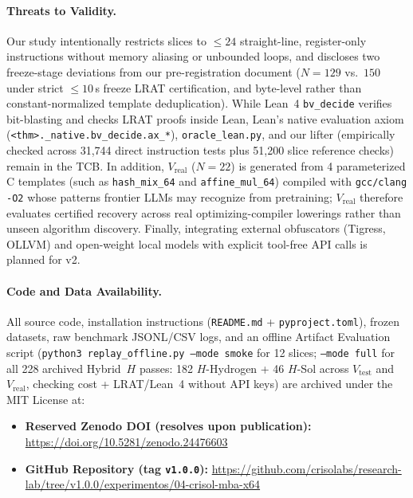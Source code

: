 \documentclass[11pt,a4paper]{article}
\begin{document}
\paragraph{Threats to Validity.}
Our study intentionally restricts slices to $\le 24$ straight-line, register-only instructions without memory aliasing or unbounded loops, and discloses two freeze-stage deviations from our pre-registration document ($N=129$ vs.\ $150$ under strict $\le 10$\,s freeze LRAT certification, and byte-level rather than constant-normalized template deduplication). While Lean~4 \texttt{bv\_decide} verifies bit-blasting and checks LRAT proofs inside Lean, Lean's native evaluation axiom (\texttt{<thm>.\_native.bv\_decide.ax\_*}), \texttt{oracle\_lean.py}, and our lifter (empirically checked across 31,744 direct instruction tests plus 51,200 slice reference checks) remain in the TCB. In addition, $V_{\mathrm{real}}$ ($N=22$) is generated from 4 parameterized C templates (such as \texttt{hash\_mix\_64} and \texttt{affine\_mul\_64}) compiled with \texttt{gcc/clang -O2} whose patterns frontier LLMs may recognize from pretraining; $V_{\mathrm{real}}$ therefore evaluates certified recovery across real optimizing-compiler lowerings rather than unseen algorithm discovery. Finally, integrating external obfuscators (Tigress, OLLVM) and open-weight local models with explicit tool-free API calls is planned for v2.

\paragraph{Code and Data Availability.}
All source code, installation instructions (\texttt{README.md} + \texttt{pyproject.toml}), frozen datasets, raw benchmark JSONL/CSV logs, and an offline Artifact Evaluation script (\texttt{python3 replay\_offline.py --mode smoke} for 12 slices; \texttt{--mode full} for all 228 archived Hybrid~$H$ passes: 182 $H$-Hydrogen + 46 $H$-Sol across $V_{\mathrm{test}}$ and $V_{\mathrm{real}}$, checking cost + LRAT/Lean~4 without API keys) are archived under the MIT License at:
\begin{itemize}[leftmargin=1.5em]
  \item \textbf{Reserved Zenodo DOI (resolves upon publication):} \url{https://doi.org/10.5281/zenodo.24476603}
  \item \textbf{GitHub Repository (tag \texttt{v1.0.0}):} \url{https://github.com/crisolabs/research-lab/tree/v1.0.0/experimentos/04-crisol-mba-x64}
\end{itemize}
\end{document}
